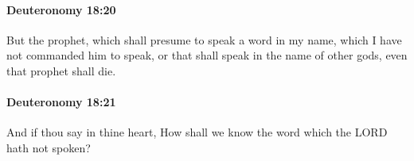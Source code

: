 		\paragraph{Deuteronomy 18:20} %
			\label{DEUTERONOMY-18-20}

			But the prophet, which shall presume to speak a word in my name, which I have not commanded him to speak, or that shall speak in the name of other gods, even that prophet shall die.


		\paragraph{Deuteronomy 18:21} %
			\label{DEUTERONOMY-18-21}

			And if thou say in thine heart, How shall we know the word which the LORD hath not spoken?



